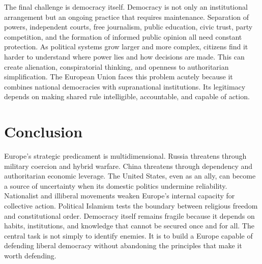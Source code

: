 \documentclass[11pt]{article}
\begin{document}
The final challenge is democracy itself. Democracy is not only an institutional arrangement but an ongoing practice that requires maintenance. Separation of powers, independent courts, free journalism, public education, civic trust, party competition, and the formation of informed public opinion all need constant protection. As political systems grow larger and more complex, citizens find it harder to understand where power lies and how decisions are made. This can create alienation, conspiratorial thinking, and openness to authoritarian simplification. The European Union faces this problem acutely because it combines national democracies with supranational institutions. Its legitimacy depends on making shared rule intelligible, accountable, and capable of action.

\section{Conclusion}

Europe's strategic predicament is multidimensional. Russia threatens through military coercion and hybrid warfare. China threatens through dependency and authoritarian economic leverage. The United States, even as an ally, can become a source of uncertainty when its domestic politics undermine reliability. Nationalist and illiberal movements weaken Europe's internal capacity for collective action. Political Islamism tests the boundary between religious freedom and constitutional order. Democracy itself remains fragile because it depends on habits, institutions, and knowledge that cannot be secured once and for all. The central task is not simply to identify enemies. It is to build a Europe capable of defending liberal democracy without abandoning the principles that make it worth defending.
\end{document}
